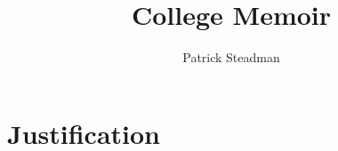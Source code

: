\documentclass[12pt]{article}
\title{College Memoir}
\author{Patrick Steadman}
\begin{document}
\maketitle

\section{Justification}
\end{document}
